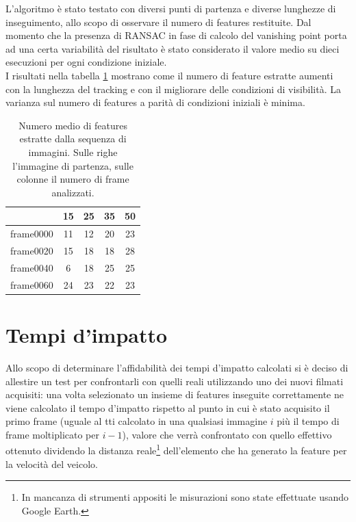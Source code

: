 \documentclass[12pt]{report}
\begin{document}
\noindent L'algoritmo \`e stato testato con diversi punti di partenza e diverse lunghezze di inseguimento, allo scopo di osservare il numero di features restituite. Dal momento che la presenza di RANSAC in fase di calcolo del vanishing point porta ad una certa variabilit\`a del risultato \`e stato considerato il valore medio su dieci esecuzioni per ogni condizione iniziale.\\
\noindent I risultati nella tabella \ref{tabNum} mostrano come il numero di feature estratte aumenti con la lunghezza del tracking e con il migliorare delle condizioni di visibilit\`a. La varianza sul numero di features a parit\`a di condizioni iniziali \`e minima.

\begin{table}[H]
\begin{center}
\begin{tabular}{|c|c|c|c|c|}
	\hline
	& 15 & 25 & 35 & 50 \\
	\hline
	frame0000 & 11 & 12 & 20 & 23\\
	\hline
	frame0020 & 15 & 18 & 18 & 28\\
	\hline
	frame0040 & 6 & 18 & 25 & 25\\
	\hline
	frame0060 & 24 & 23 & 22 & 23\\
	\hline
\end{tabular}
\caption{Numero medio di features estratte dalla sequenza di immagini. Sulle righe l'immagine di partenza, sulle colonne il numero di frame analizzati.}
\label{tabNum}
\end{center}
\end{table}



\newpage
\section{Tempi d'impatto}
\noindent Allo scopo di determinare l'affidabilit\`a dei tempi d'impatto calcolati si \`e deciso di allestire un test per confrontarli con quelli reali utilizzando uno dei nuovi filmati acquisiti: una volta selezionato un insieme di features inseguite correttamente ne viene calcolato il tempo d'impatto rispetto al punto in cui \`e stato acquisito il primo frame (uguale al tti calcolato in una qualsiasi immagine $i$ pi\`u il tempo di frame moltiplicato per $i-1$), valore che verr\`a confrontato con quello effettivo ottenuto dividendo la distanza reale\footnote{In mancanza di strumenti appositi le misurazioni sono state effettuate usando Google Earth.} dell'elemento che ha generato la feature per la velocit\`a del veicolo.\\
\end{document}
